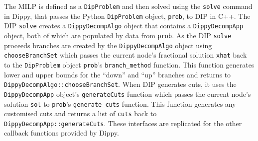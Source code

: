 The \ac{MILP} is defined as a {\tt DipProblem} and then solved using the {\tt solve} command in Dippy, that passes the Python {\tt DipProblem} object, {\tt prob}, to DIP in C++. The DIP {\tt solve} creates a {\tt DippyDecompAlgo} object that contains a {\tt DippyDecompApp} object, both of which are populated by data from {\tt prob}. As the DIP {\tt solve} proceeds branches are created by the {\tt DippyDecompAlgo} object using {\tt chooseBranchSet} which passes the current node's fractional solution {\tt xhat} back to the {\tt DipProblem} object {\tt prob}'s {\tt branch\_method} function. This function generates lower and upper bounds for the ``down'' and ``up'' branches and returns to {\tt DippyDecompAlgo::chooseBranchSet}. When DIP generates cuts, it uses the {\tt DippyDecompApp} object's {\tt generateCuts} function which passes the current node's solution {\tt sol} to {\tt prob}'s {\tt generate\_cuts} function. This function generates any customised cuts and returns a list of {\tt cuts} back to \\ {\tt DippyDecompApp::generateCuts}. These interfaces are replicated for the other callback functions provided by Dippy.
